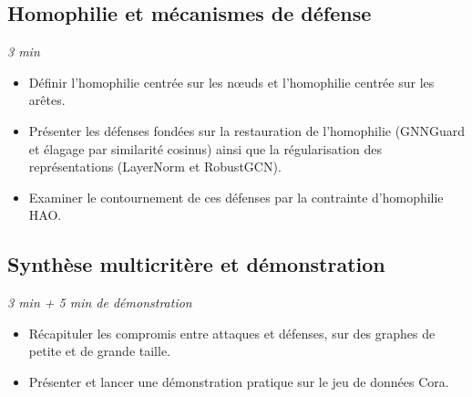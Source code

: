 \documentclass[11pt,a4paper]{article}
\newcommand{\duree}[1]{\hfill\textit{#1}}
\begin{document}
\subsection{Homophilie et mécanismes de défense}\duree{3 min}
\begin{itemize}
    \item Définir l'homophilie centrée sur les nœuds et l'homophilie centrée
    sur les arêtes.
    \item Présenter les défenses fondées sur la restauration de l'homophilie
    (GNNGuard et élagage par similarité cosinus) ainsi que la régularisation
    des représentations (LayerNorm et RobustGCN).
    \item Examiner le contournement de ces défenses par la contrainte
    d'homophilie HAO.
\end{itemize}

\subsection{Synthèse multicritère et démonstration}\duree{3 min + 5 min de démonstration}
\begin{itemize}
    \item Récapituler les compromis entre attaques et défenses, sur des graphes
    de petite et de grande taille.
    \item Présenter et lancer une démonstration pratique sur le jeu de données
    Cora.
\end{itemize}
\end{document}
